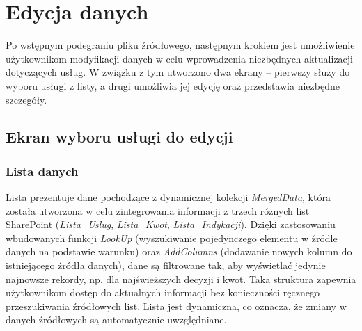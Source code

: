 \section{Edycja danych}

Po wstępnym podegraniu pliku źródłowego, następnym krokiem jest umożliwienie użytkownikom modyfikacji danych w celu wprowadzenia niezbędnych aktualizacji dotyczących usług. W związku z tym utworzono dwa ekrany -- pierwszy służy do wyboru usługi z listy, a drugi umożliwia jej edycję oraz przedstawia niezbędne szczegóły.

\subsection{Ekran wyboru usługi do edycji}

\begin{comment}

Ekran wyboru elementu do obróbki składa się z: \begin{enumerate}
   \item listy, przedstawiającej dane z tymczasowej kolekcji \textit{MergedData}, utworzonej specjalnie na potrzeby obsługi wyboru danych do edycji,
   \item pól wyszukiwania i filtrów, umożliwiających zawężenie listy na podstawie nazwy usługi, identyfikatora (\textit{Service ID}), miejsca powstawania kosztów (\textit{MPK}) oraz statusu decyzji (\textit{Accepted}, \textit{Not Accepted}, \textit{No Status}),
   \item wykresu kołowego, prezentującego wizualne podsumowanie liczby elementów w każdej kategorii statusu decyzji,
   \item interfejsu umożliwiającego dynamiczne dopasowanie wyników listy w czasie rzeczywistym, na podstawie wprowadzonych kryteriów wyszukiwania,
   \item nagłówka, który przedstawia kontekst użytkownika, w tym nazwę i dane aktualnie zalogowanego użytkownika. \end{enumerate}
\end{comment}

\subsubsection*{Lista danych}
Lista prezentuje dane pochodzące z dynamicznej kolekcji \textit{MergedData}, która została utworzona w celu zintegrowania informacji z trzech różnych list SharePoint (\textit{Lista\_Uslug}, \textit{Lista\_Kwot}, \textit{Lista\_Indykacji}). Dzięki zastosowaniu wbudowanych funkcji \textit{LookUp} (wyszukiwanie pojedynczego elementu w źródle danych na podstawie warunku) oraz \textit{AddColumns} (dodawanie nowych kolumn do istniejącego źródła danych), dane są filtrowane tak, aby wyświetlać jedynie najnowsze rekordy, np. dla najświeższych decyzji i kwot. Taka struktura zapewnia użytkownikom dostęp do aktualnych informacji bez konieczności ręcznego przeszukiwania źródłowych list. Lista jest dynamiczna, co oznacza, że zmiany w danych źródłowych są automatycznie uwzględniane.

